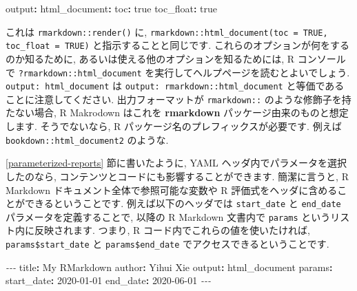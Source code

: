 \documentclass[
  11pt,
  lualatex,
  ja=standard]{bxjsreport}
\newenvironment{Shaded}{\begin{snugshade}}{\end{snugshade}}
\newcommand{\AttributeTok}[1]{\textcolor[rgb]{0.77,0.63,0.00}{#1}}
\newcommand{\CharTok}[1]{\textcolor[rgb]{0.31,0.60,0.02}{#1}}
\newcommand{\FunctionTok}[1]{\textcolor[rgb]{0.00,0.00,0.00}{#1}}
\newcommand{\KeywordTok}[1]{\textcolor[rgb]{0.13,0.29,0.53}{\textbf{#1}}}
\newcommand{\PreprocessorTok}[1]{\textcolor[rgb]{0.56,0.35,0.01}{\textit{#1}}}
\newcommand{\StringTok}[1]{\textcolor[rgb]{0.31,0.60,0.02}{#1}}
\begin{document}
\begin{Shaded}
\begin{Highlighting}[]
\FunctionTok{output}\KeywordTok{:}
\AttributeTok{  }\FunctionTok{html\_document}\KeywordTok{:}
\AttributeTok{    }\FunctionTok{toc}\KeywordTok{:}\AttributeTok{ }\CharTok{true}
\AttributeTok{    }\FunctionTok{toc\_float}\KeywordTok{:}\AttributeTok{ }\CharTok{true}
\end{Highlighting}
\end{Shaded}

これは \texttt{rmarkdown::render()} に, \texttt{rmarkdown::html\_document(toc = TRUE, toc\_float = TRUE)} と指示することと同じです. これらのオプションが何をするのか知るために, あるいは使える他のオプションを知るためには, R コンソールで \texttt{?rmarkdown::html\_document} を実行してヘルプページを読むとよいでしょう. \texttt{output: html\_document} は \texttt{output: rmarkdown::html\_document} と等価であることに注意してください. 出力フォーマットが \texttt{rmarkdown::} のような修飾子を持たない場合, R Makrodown はこれを \textbf{rmarkdown} パッケージ由来のものと想定します. そうでないなら, R パッケージ名のプレフィックスが必要です. 例えば \texttt{bookdown::html\_document2} のような.

\ref{parameterized-reports} 節に書いたように, YAML ヘッダ内でパラメータを選択したのなら, コンテンツとコードにも影響することができます. 簡潔に言うと, R Markdown ドキュメント全体で参照可能な変数や R 評価式をヘッダに含めることができるということです. 例えば以下のヘッダでは \texttt{start\_date} と \texttt{end\_date} パラメータを定義することで, 以降の R Markdown 文書内で \texttt{params} というリスト内に反映されます. つまり, R コード内でこれらの値を使いたければ, \texttt{params\$start\_date} と \texttt{params\$end\_date} でアクセスできるということです.

\begin{Shaded}
\begin{Highlighting}[]
\PreprocessorTok{{-}{-}{-}}
\FunctionTok{title}\KeywordTok{:}\AttributeTok{ My RMarkdown}
\FunctionTok{author}\KeywordTok{:}\AttributeTok{ Yihui Xie}
\FunctionTok{output}\KeywordTok{:}\AttributeTok{ html\_document}
\FunctionTok{params}\KeywordTok{:}
\AttributeTok{  }\FunctionTok{start\_date}\KeywordTok{:}\AttributeTok{ }\StringTok{\textquotesingle{}2020{-}01{-}01\textquotesingle{}}
\AttributeTok{  }\FunctionTok{end\_date}\KeywordTok{:}\AttributeTok{ }\StringTok{\textquotesingle{}2020{-}06{-}01\textquotesingle{}}
\PreprocessorTok{{-}{-}{-}}
\end{Highlighting}
\end{Shaded}
\end{document}
